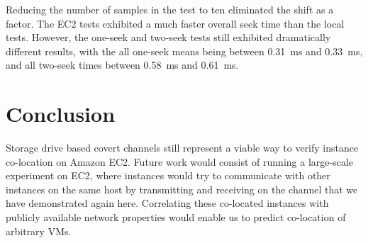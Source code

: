 \documentclass[conference]{IEEEtran}
\begin{document}
Reducing the number of samples in the test to ten eliminated the shift as a factor.
The EC2 tests exhibited a much faster overall seek time than the local tests.
However, the one-seek and two-seek tests still exhibited dramatically different results, with the all one-seek means
  being between \SI{0.31}{ms} and \SI{0.33}{ms}, and all two-seek times between \SI{0.58}{ms} and \SI{0.61}{ms}.

\section{Conclusion}
Storage drive based covert channels still represent a viable way to verify instance co-location on Amazon EC2.
Future work would consist of running a large-scale experiment on EC2, where instances would try to communicate with
  other instances on the same host by transmitting and receiving on the channel that we have demonstrated again here.
Correlating these co-located instances with publicly available network properties would enable us to predict
  co-location of arbitrary VMs.



\end{document}
